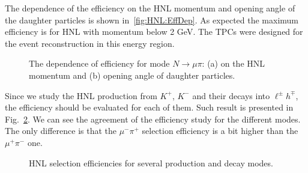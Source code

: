 \documentclass[../main.tex]{subfiles}
\begin{document}
The dependence of the efficiency on the HNL momentum and opening angle of the daughter particles is shown in~\autoref{fig:HNL:EffDep}. As expected the maximum efficiency is for HNL with momentum below 2 GeV. The TPCs were designed for the event reconstruction in this energy region.
\begin{figure}[!ht]
  \begin{minipage}{0.49\linewidth}
  \end{minipage}
  \hfill
  \begin{minipage}{0.49\linewidth}
  \end{minipage}
  \caption{The dependence of efficiency for mode $N\to\mu\pi$: (a) on the HNL momentum and (b) opening angle of daughter particles.}
  \label{fig:HNL:EffDep}
\end{figure}

Since we study the HNL production from $K^+$,  $K^-$ and their decays into $\ell^{\pm}h^{\mp}$, the efficiency should be evaluated for each of them. Such result is presented in Fig.~\ref{fig:HNL:C_check}. We can see the agreement of the efficiency study for the different modes. The only difference is that the $\mu^-\pi^+$ selection efficiency is a bit higher than the $\mu^+\pi^-$ one.
\begin{figure}[!ht]
  \begin{minipage}{0.49\linewidth}
  \end{minipage}
  \hfill
  \begin{minipage}{0.49\linewidth}
  \end{minipage}
  \caption{HNL selection efficiencies for several production and decay modes.}
  \label{fig:HNL:C_check}
\end{figure}
\end{document}
